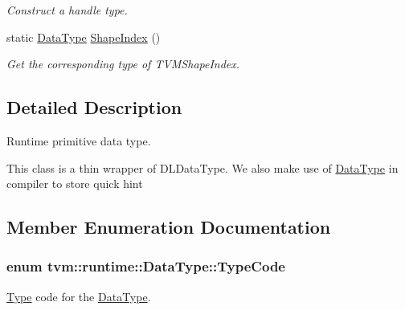\begin{DoxyCompactItemize}
\begin{DoxyCompactList}\small\item\em Construct a handle type. \end{DoxyCompactList}\item 
static \hyperlink{classtvm_1_1runtime_1_1DataType}{Data\+Type} \hyperlink{classtvm_1_1runtime_1_1DataType_a04f0e069017af3f0da47bc0c1fd80916}{Shape\+Index} ()
\begin{DoxyCompactList}\small\item\em Get the corresponding type of T\+V\+M\+Shape\+Index. \end{DoxyCompactList}\end{DoxyCompactItemize}


\subsection{Detailed Description}
Runtime primitive data type. 

This class is a thin wrapper of D\+L\+Data\+Type. We also make use of \hyperlink{classtvm_1_1runtime_1_1DataType}{Data\+Type} in compiler to store quick hint 

\subsection{Member Enumeration Documentation}
\subsubsection[{\texorpdfstring{Type\+Code}{TypeCode}}]{\setlength{\rightskip}{0pt plus 5cm}enum {\bf tvm\+::runtime\+::\+Data\+Type\+::\+Type\+Code}}\hypertarget{classtvm_1_1runtime_1_1DataType_a3c9ce1627be2550f656cd37b6c698c7d}{}\label{classtvm_1_1runtime_1_1DataType_a3c9ce1627be2550f656cd37b6c698c7d}


\hyperlink{classtvm_1_1Type}{Type} code for the \hyperlink{classtvm_1_1runtime_1_1DataType}{Data\+Type}. 

